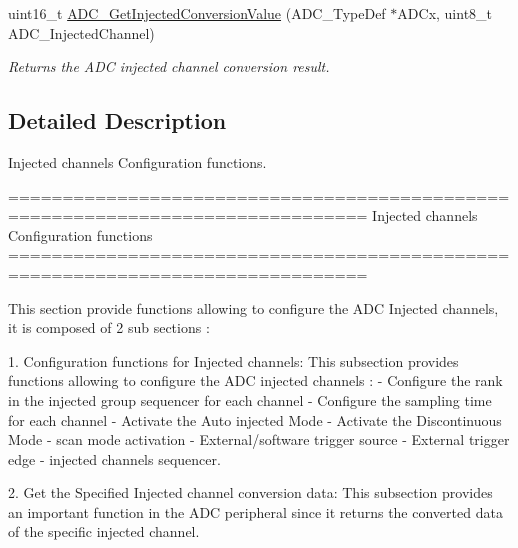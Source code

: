 \begin{DoxyCompactItemize}
uint16\-\_\-t \hyperlink{group___a_d_c___group6_ga1dea5ed24571a2e0ce4cbd41c9c1ec46}{A\-D\-C\-\_\-\-Get\-Injected\-Conversion\-Value} (A\-D\-C\-\_\-\-Type\-Def $\ast$A\-D\-Cx, uint8\-\_\-t A\-D\-C\-\_\-\-Injected\-Channel)
\begin{DoxyCompactList}\small\item\em Returns the A\-D\-C injected channel conversion result. \end{DoxyCompactList}\end{DoxyCompactItemize}


\subsection{Detailed Description}
Injected channels Configuration functions. \begin{DoxyVerb} ===============================================================================
                     Injected channels Configuration functions
 ===============================================================================  

  This section provide functions allowing to configure the ADC Injected channels,
  it is composed of 2 sub sections : 
    
  1. Configuration functions for Injected channels: This subsection provides 
     functions allowing to configure the ADC injected channels :    
    - Configure the rank in the injected group sequencer for each channel
    - Configure the sampling time for each channel    
    - Activate the Auto injected Mode  
    - Activate the Discontinuous Mode 
    - scan mode activation  
    - External/software trigger source   
    - External trigger edge 
    - injected channels sequencer.
    
   2. Get the Specified Injected channel conversion data: This subsection 
      provides an important function in the ADC peripheral since it returns the 
      converted data of the specific injected channel.\end{DoxyVerb}
 

